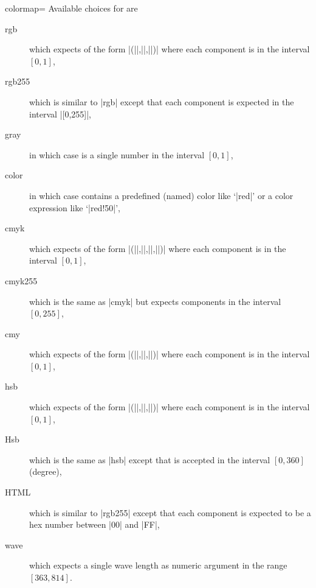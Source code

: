 \begin{pgfplotskey}{colormap=}
Available choices for  are
\begin{description}
\item[rgb] which expects  of the form |(||,||,||)| where each component is in the interval $[0,1]$,
\item[rgb255] which is similar to |rgb| except that each component is expected in the interval |[0,255]|,
\item[gray] in which case  is a single number in the interval $[0,1]$,
\item[color] in which case  contains a predefined (named) color like `|red|' or a color expression like `|red!50|',
\item[cmyk] which expects  of the form |(||,||,||,||)| where each component is in the interval $[0,1]$,
\item[cmyk255] which is the same as |cmyk| but expects components in the interval $[0,255]$,
\item[cmy] which expects  of the form |(||,||,||)| where each component is in the interval $[0,1]$,
\item[hsb] which expects  of the form |(||,||,||)| where each component is in the interval $[0,1]$,
\item[Hsb] which is the same as |hsb| except that  is accepted in the interval $[0,360]$ (degree),
\item[HTML] which is similar to |rgb255| except that each component is expected to be a hex number between |00| and |FF|,
\item[wave] which expects a single wave length as numeric argument in the range $[363,814]$.
\end{description}

\begin{codeexample}[]
\end{codeexample}


\end{pgfplotskey}
